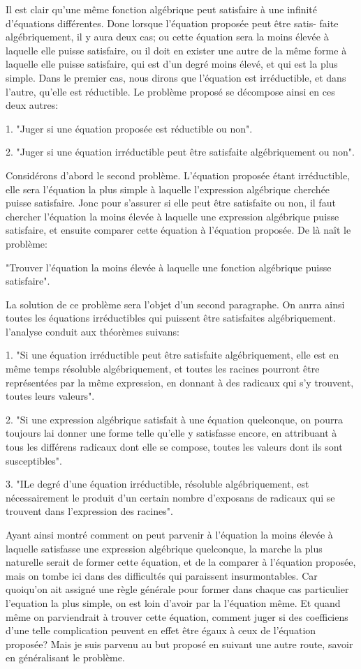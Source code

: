 \documentclass{article}
\begin{document}
Il est clair qu'une même fonction algébrique peut satisfaire à une infinité d'équations différentes. Done lorsque l'équation proposée peut être satis-
faite algébriquement, il y aura deux cas; ou cette équation sera la moins élevée à laquelle elle puisse satisfaire, ou il doit en exister une autre de la même forme à laquelle elle puisse satisfaire, qui est d'un degré moins élevé, et qui est la plus simple. Dans le premier cas, nous dirons que l'équation est irréductible, et dans l'autre, qu'elle est réductible. Le problème proposé se décompose ainsi en ces deux autres:

1. "Juger si une équation proposée est réductible ou non".

2. "Juger si une équation irréductible peut être satisfaite algébriquement ou non".

Considérons d'abord le second problème. L'équation proposée étant irréductible, elle sera l'équation la plus simple à laquelle l'expression algébrique cherchée puisse satisfaire. Jonc pour s'assurer si elle peut être satisfaite ou non, il faut chercher l'équation la moins élevée à laquelle une expression algébrique puisse satisfaire, et ensuite comparer cette équation à l'équation proposée. De là naît le problème:

"Trouver l'équation la moins élevée à laquelle une fonction algébrique puisse satisfaire".

La solution de ce problème sera l'objet d'un second paragraphe. On anrra ainsi toutes les équations irréductibles qui puissent être satisfaites algébriquement. l'analyse conduit aux théorèmes suivans:

1. "Si une équation irréductible peut être satisfaite algébriquement, elle est en même temps résoluble algébriquement, et toutes les racines pourront être représentées par la même expression, en donnant à des radicaux qui s'y trouvent, toutes leurs valeurs".

2. "Si une expression algébrique satisfait à une équation quelconque, on pourra toujours lai donner une forme telle qu'elle y satisfasse encore, en attribuant à tous les différens radicaux dont elle se compose, toutes les valeurs dont ils sont susceptibles".

3. "ILe degré d'une équation irréductible, résoluble algébriquement, est nécessairement le produit d'un certain nombre d'exposans de radicaux qui se trouvent dans l'expression des racines".

Ayant ainsi montré comment on peut parvenir à l'équation la moins élevée à laquelle satisfasse une expression algébrique quelconque, la marche la plus naturelle serait de former cette équation, et de la comparer à l'équation proposée, mais on tombe ici dans des difficultés qui paraissent insurmontables. Car quoiqu'on ait assigné une règle générale pour former dans chaque cas particulier l'equation la plus simple, on est loin d'avoir par la
l'équation même. Et quand même on parviendrait à trouver cette équation, comment juger si des coefficiens d'une telle complication peuvent en effet être égaux à ceux de l'équation proposée? Mais je suis parvenu au but proposé en suivant une autre route, savoir en généralisant le problème.
\end{document}
